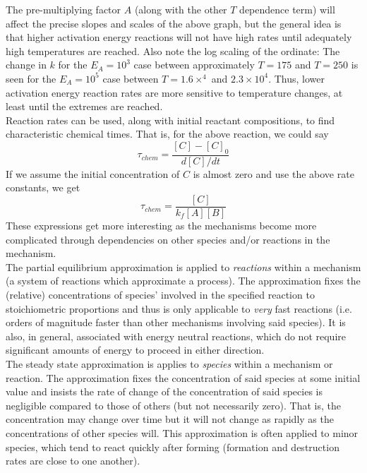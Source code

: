 \documentclass[11pt]{article}
\begin{document}
The pre-multiplying factor $A$ (along with the other $T$ dependence term) will affect the precise slopes and scales of the above graph, but the general idea is that higher activation energy reactions will not have high rates until adequately high temperatures are reached. Also note the log scaling of the ordinate: The change in $k$ for the $E_A=10^3$ case between approximately $T=175$ and $T=250$ is seen for the $E_A=10^5$ case between $T=1.6\times^4$ and $2.3\times10^4$. Thus, lower activation energy reaction rates are more sensitive to temperature changes, at least until the extremes are reached.\\

Reaction rates can be used, along with initial reactant compositions, to find characteristic chemical times. That is, for the above reaction, we could say
$$\tau_{chem} = \frac{[C]-[C]_0}{d[C]/dt}$$
If we assume the initial concentration of $C$ is almost zero and use the above rate constants, we get
$$\tau_{chem} = \frac{[C]}{k_f[A][B]}$$
These expressions get more interesting as the mechanisms become more complicated through dependencies on other species and/or reactions in the mechanism.\\

The partial equilibrium approximation is applied to \emph{reactions} within a mechanism (a system of reactions which approximate a process). The approximation fixes the (relative) concentrations of species' involved in the specified reaction to stoichiometric proportions and thus is only applicable to \emph{very} fast reactions (i.e. orders of magnitude faster than other mechanisms involving said species). It is also, in general, associated with energy neutral reactions, which do not require significant amounts of energy to proceed in either direction.\\

The steady state approximation is applies to \emph{species} within a mechanism or reaction. The approximation fixes the concentration of said species at some initial value and insists the rate of change of the concentration of said species is negligible compared to those of others (but not necessarily zero). That is, the concentration may change over time but it will not change as rapidly as the concentrations of other species will. This approximation is often applied to minor species, which tend to react quickly after forming (formation and destruction rates are close to one another).\\
\end{document}
